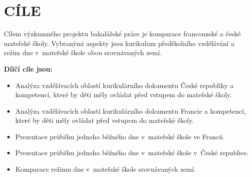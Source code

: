 \chapter{CÍLE}

Cílem výzkumného projektu bakalářské práce je komparace francouzské a české mateřské školy. Vybranými aspekty jsou kurikulum předškolního vzdělávání a režim dne v mateřské škole obou srovnávaných zemí. 

\vspace{10mm}
\noindent
\textbf{Dílčí cíle jsou:}
\begin{itemize}
\item[] Analýza vzdělávacích oblastí kurikulárního dokumentu České republiky a kompetencí, které by děti měly ovládat před vstupem do mateřské školy.
\item[] Analýza vzdělávacích oblastí kurikulárního dokumentu Francie a kompetencí, které by děti měly ovládat před vstupem do mateřské školy. 
\item[] Prezentace průběhu jednoho běžného dne v mateřské škole ve Francii.
\item[] Prezentace průběhu jednoho běžného dne v mateřské škole v České republice.
\item[] Komparace režimu dne v mateřské škole srovnávaných zemí.
\end{itemize}